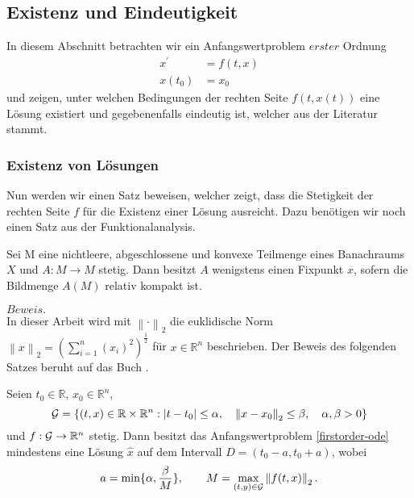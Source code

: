 \subsection{Existenz und Eindeutigkeit}
In diesem Abschnitt betrachten wir ein Anfangswertproblem $erster$ Ordnung
\begin{align}
    x^{\prime}&=f(t,x) \nonumber \\
    x(t_{0})&=x_{0} \label{firstorder-ode}
\end{align}
und zeigen, unter welchen Bedingungen der rechten Seite $f(t,x(t))$ eine Lösung existiert und gegebenenfalls eindeutig
ist, welcher aus der Literatur \cite[13, 14]{sundermeierFixpunktsatzSchauder} stammt.

\subsubsection{Existenz von Lösungen}
Nun werden wir einen Satz beweisen, welcher zeigt, dass die Stetigkeit der rechten Seite $f$ für die Existenz einer
Lösung ausreicht. Dazu benötigen wir noch einen Satz aus der Funktionalanalysis.
\begin{satz}
    \label{fixpunktsatzvonschauder}
    Sei M eine nichtleere, abgeschlossene und konvexe Teilmenge eines Banachraums $X$ und $A:M \rightarrow M$ stetig.
    Dann besitzt $A$ wenigstens einen Fixpunkt $x$, sofern die Bildmenge $A(M)$ relativ kompakt ist.
\end{satz}
$Beweis.$ \cite[13,14]{sundermeierFixpunktsatzSchauder}\\
In dieser Arbeit wird mit $\left\lVert \cdot \right\rVert_2$ die euklidische Norm
$\left\lVert x \right\rVert_2 = \left( \sum_{i=1}^{n} (x_i)^2  \right)^{\frac{1}{2}}$ für $x \in \mathbb{R}^n$
beschrieben. Der Beweis des folgenden Satzes beruht auf das Buch \cite{harroheuserGewohnlicheDifferentialgleichungen}.
\begin{satz}
\label{peano}
    Seien $t_0 \in \mathbb{R}$, $x_0 \in \mathbb{R}^n$,
    \[
        {\cal G}=\{(t,x) \in \mathbb{R} \times \mathbb{R}^{n}: |t-t_{0}| \leq \alpha, \quad
        \left\lVert x-x_{0} \right\rVert_2 \leq\beta, \quad \alpha,\beta > 0 \}
    \]
    und $f:{\cal G} \rightarrow \mathbb{R}^{n}$ stetig. Dann besitzt das Anfangswertproblem \eqref{firstorder-ode}
    mindestens eine Lösung $\hat{x}$ auf dem Intervall $D=(t_{0}-a,t_{0}+a)$, wobei
    \[
        a=\min\{\alpha, \frac{\beta}{M}\}, \qquad M= \max_{(t,y)\in {\cal G}}\left\lVert f(t,x)\right\rVert_2.
    \]
\end{satz}
